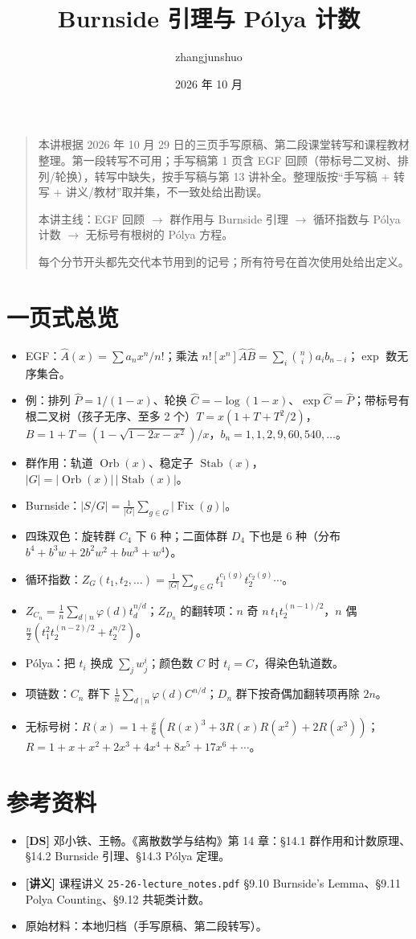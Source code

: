 \documentclass[UTF8,a4paper,11pt]{ctexart}
\title{Burnside 引理与 Pólya 计数}\author{zhangjunshuo}\date{2026 年 10 月}
\begin{document}
\maketitle
\begin{quote}
本讲根据 2026 年 10 月 29 日的三页手写原稿、第二段课堂转写和课程教材整理。第一段转写不可用；手写稿第 1 页含 EGF 回顾（带标号二叉树、排列/轮换），转写中缺失，按手写稿与第 13 讲补全。整理版按“手写稿 + 转写 + 讲义/教材”取并集，不一致处给出勘误。

本讲主线：EGF 回顾 $\to$ 群作用与 Burnside 引理 $\to$ 循环指数与 Pólya 计数 $\to$ 无标号有根树的 Pólya 方程。

每个分节开头都先交代本节用到的记号；所有符号在首次使用处给出定义。
\end{quote}
\tableofcontents\clearpage






\section*{一页式总览}
\begin{itemize}
\item EGF：$\hat A(x)=\sum a_nx^n/n!$；乘法 $n![x^n]\hat A\hat B=\sum_i\binom ni a_ib_{n-i}$；$\exp$ 数无序集合。
\item 例：排列 $\hat P=1/(1-x)$、轮换 $\hat C=-\log(1-x)$、$\exp\hat C=\hat P$；带标号有根二叉树（孩子无序、至多 2 个）$T=x(1+T+T^2/2)$，$B=1+T=(1-\sqrt{1-2x-x^2})/x$，$b_n=1,1,2,9,60,540,\dots$。
\item 群作用：轨道 $\operatorname{Orb}(x)$、稳定子 $\operatorname{Stab}(x)$，$|G|=|\operatorname{Orb}(x)|\,|\operatorname{Stab}(x)|$。
\item Burnside：$|S/G|=\frac1{|G|}\sum_{g\in G}|\operatorname{Fix}(g)|$。
\item 四珠双色：旋转群 $C_4$ 下 $6$ 种；二面体群 $D_4$ 下也是 $6$ 种（分布 $b^4+b^3w+2b^2w^2+bw^3+w^4$）。
\item 循环指数：$Z_G(t_1,t_2,\dots)=\frac1{|G|}\sum_{g\in G}t_1^{c_1(g)}t_2^{c_2(g)}\cdots$。
\item $Z_{C_n}=\frac1n\sum_{d\mid n}\varphi(d)t_d^{n/d}$；$Z_{D_n}$ 的翻转项：$n$ 奇 $n\,t_1t_2^{(n-1)/2}$，$n$ 偶 $\frac n2(t_1^2t_2^{(n-2)/2}+t_2^{n/2})$。
\item Pólya：把 $t_i$ 换成 $\sum_j w_j^i$；颜色数 $C$ 时 $t_i=C$，得染色轨道数。
\item 项链数：$C_n$ 群下 $\frac1n\sum_{d\mid n}\varphi(d)C^{n/d}$；$D_n$ 群下按奇偶加翻转项再除 $2n$。
\item 无标号树：$R(x)=1+\frac{x}{6}(R(x)^3+3R(x)R(x^2)+2R(x^3))$；$R=1+x+x^2+2x^3+4x^4+8x^5+17x^6+\cdots$。
\end{itemize}

\section*{参考资料}
\begin{itemize}
\item \textbf{[DS]} 邓小铁、王畅。《离散数学与结构》第 14 章：§14.1 群作用和计数原理、§14.2 Burnside 引理、§14.3 Pólya 定理。
\item \textbf{[讲义]} 课程讲义 \texttt{25-26-lecture\_notes.pdf} §9.10 Burnside's Lemma、§9.11 Polya Counting、§9.12 共轭类计数。
\item 原始材料：本地归档（手写原稿、第二段转写）。
\end{itemize}
\end{document}
